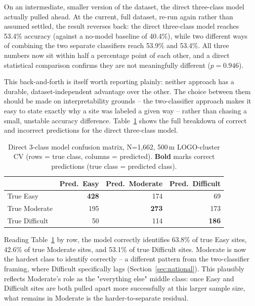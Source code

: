 \documentclass[11pt,a4paper]{article}
\begin{document}
On an intermediate, smaller version of the dataset, the direct three-class model actually pulled ahead. At the current, full dataset, re-run again rather than assumed settled, the result reverses back: the direct three-class model reaches 53.4\% accuracy (against a no-model baseline of 40.4\%), while two different ways of combining the two separate classifiers reach 53.9\% and 53.4\%. All three numbers now sit within half a percentage point of each other, and a direct statistical comparison confirms they are not meaningfully different ($p=0.946$).

This back-and-forth is itself worth reporting plainly: neither approach has a durable, dataset-independent advantage over the other. The choice between them should be made on interpretability grounds -- the two-classifier approach makes it easy to state exactly why a site was labeled a given way -- rather than chasing a small, unstable accuracy difference. Table~\ref{tab:3class-confusion} shows the full breakdown of correct and incorrect predictions for the direct three-class model.

\begin{table}[H]
\centering\small
\caption{Direct 3-class model confusion matrix, N=1{,}662, 500\,m LOGO-cluster CV (rows = true class, columns = predicted). \textbf{Bold} marks correct predictions (true class = predicted class).}
\label{tab:3class-confusion}
\begin{tabular}{@{}lrrr@{}}
\toprule
 & Pred.\ Easy & Pred.\ Moderate & Pred.\ Difficult \\
\midrule
True Easy & \textbf{428} & 174 & 69 \\
True Moderate & 195 & \textbf{273} & 173 \\
True Difficult & 50 & 114 & \textbf{186} \\
\bottomrule
\end{tabular}
\end{table}

Reading Table~\ref{tab:3class-confusion} by row, the model correctly identifies 63.8\% of true Easy sites, 42.6\% of true Moderate sites, and 53.1\% of true Difficult sites. Moderate is now the hardest class to identify correctly -- a different pattern from the two-classifier framing, where Difficult specifically lags (Section~\ref{sec:national}). This plausibly reflects Moderate's role as the "everything else" middle class: once Easy and Difficult sites are both pulled apart more successfully at this larger sample size, what remains in Moderate is the harder-to-separate residual.
\end{document}
